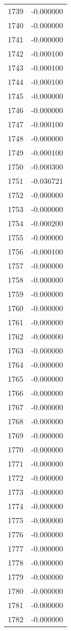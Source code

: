 \documentclass[12pt]{article}
\begin{document}
\begin{longtable}{@{}cc@{}}
1739 & -0.000000 \\
1740 & -0.000000 \\
1741 & -0.000000 \\
1742 & -0.000100 \\
1743 & -0.000100 \\
1744 & -0.000100 \\
1745 & -0.000000 \\
1746 & -0.000000 \\
1747 & -0.000100 \\
1748 & -0.000000 \\
1749 & -0.000100 \\
1750 & -0.000300 \\
1751 & -0.036721 \\
1752 & -0.000000 \\
1753 & -0.000000 \\
1754 & -0.000200 \\
1755 & -0.000000 \\
1756 & -0.000100 \\
1757 & -0.000000 \\
1758 & -0.000000 \\
1759 & -0.000000 \\
1760 & -0.000000 \\
1761 & -0.000000 \\
1762 & -0.000000 \\
1763 & -0.000000 \\
1764 & -0.000000 \\
1765 & -0.000000 \\
1766 & -0.000000 \\
1767 & -0.000000 \\
1768 & -0.000000 \\
1769 & -0.000000 \\
1770 & -0.000000 \\
1771 & -0.000000 \\
1772 & -0.000000 \\
1773 & -0.000000 \\
1774 & -0.000000 \\
1775 & -0.000000 \\
1776 & -0.000000 \\
1777 & -0.000000 \\
1778 & -0.000000 \\
1779 & -0.000000 \\
1780 & -0.000000 \\
1781 & -0.000000 \\
1782 & -0.000000 \\

\end{longtable}
\end{document}
